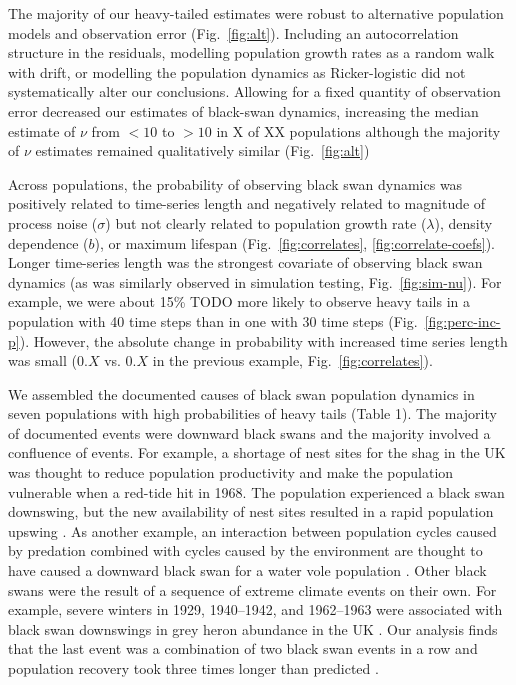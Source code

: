 The majority of our heavy-tailed estimates were robust to alternative
population models and observation error (Fig.~\ref{fig:alt}). Including an
autocorrelation structure in the residuals, modelling population growth rates
as a random walk with drift, or modelling the population dynamics as
Ricker-logistic did not systematically alter our conclusions. Allowing for
a fixed quantity of observation error decreased our estimates of black-swan
dynamics, increasing the median estimate of $\nu$ from $<10$ to $>10$ in X of
XX populations although the majority of $\nu$ estimates remained qualitatively
similar (Fig.~\ref{fig:alt})

Across populations, the probability of observing black swan dynamics was
positively related to time-series length and negatively related to magnitude of
process noise ($\sigma$) but not clearly related to population growth rate
($\lambda$), density dependence ($b$), or maximum lifespan
(Fig.~\ref{fig:correlates}, \ref{fig:correlate-coefs}). Longer time-series
length was the strongest covariate of observing black swan dynamics (as was
similarly observed in simulation testing, Fig.~\ref{fig:sim-nu}). For example,
we were about 15\% TODO more likely to observe heavy tails in a population with
40 time steps than in one with 30 time steps (Fig.~\ref{fig:perc-inc-p}).
However, the absolute change in probability with increased time series length
was small ($0.X$ vs. $0.X$ in the previous example, Fig.~\ref{fig:correlates}).

We assembled the documented causes of black swan population dynamics in seven
populations with high probabilities of heavy tails (Table 1). The majority of
documented events were downward black swans and the majority involved
a confluence of events. For example, a shortage of nest sites for the shag in
the UK was thought to reduce population productivity and make the population
vulnerable when a red-tide hit in 1968. The population experienced a black swan
downswing, but the new availability of nest sites resulted in a rapid
population upswing \citep{potts1980}. As another example, an interaction
between population cycles caused by predation combined with cycles caused by
the environment are thought to have caused a downward black swan for a water
vole population \citep{saucy1994}. Other black swans were the result of
a sequence of extreme climate events on their own. For example, severe winters
in 1929, 1940--1942, and 1962--1963 were associated with black swan downswings
in grey heron abundance in the UK \citep{stafford1971}. Our analysis finds that
the last event was a combination of two black swan events in a row and
population recovery took three times longer than predicted
\citep{stafford1971}.

